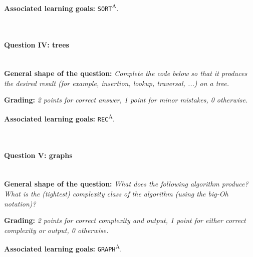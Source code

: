 \textbf{Associated learning goals:} \texttt{SORT}\textsuperscript{A}.

\ \\ 
\paragraph*{Question IV: trees} \ \\

\textbf{General shape of the question:} \textit{Complete the code below so that it produces the desired result (for example, insertion, lookup, traversal, ...) on a tree.} \ 

\textbf{Grading:} \textit{2 points for correct answer, 1 point for minor mistakes, 0 otherwise.} \ 

\textbf{Associated learning goals:} \texttt{REC}\textsuperscript{A}.

\ \\ 
\paragraph*{Question V: graphs} \ \\

\textbf{General shape of the question:} \textit{What does the following algorithm produce? What is the (tightest) complexity class of the algorithm (using the big-Oh notation)?} \ 

\textbf{Grading:} \textit{2 points for correct complexity and output, 1 point for either correct complexity or output, 0 otherwise.} \ 

\textbf{Associated learning goals:} \texttt{GRAPH}\textsuperscript{A}.

\ \\ 




\begin{comment}
	\begin{tabular}{|p{3cm}|p{3.5cm}|p{6cm}|}
		\hline
		\textbf{Learning goal} & \textbf{Dublin descriptors} & \textbf{Tested through} \\
		\hline
		\texttt{KNOW} & 1 & Theoretical examination \\
		\hline
		\texttt{IMPL} & 2 & Practical examination \\
		\hline
		\texttt{AN} & 3 & Theoretical examination \\
		\hline
		\texttt{APP} & 2, 3 & Theoretical and practical examination \\
		\hline
	\end{tabular}
	
	\vspace{1cm}

	Dublin-descriptors:
	\begin{enumerate}
		\item Knowledge and understanding
		\item Applying knowledge and understanding
		\item Making judgements
		\item Communication
		\item Learning skills
	\end{enumerate}
\end{comment}